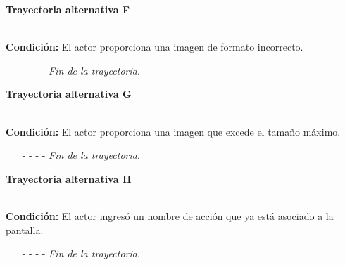 \hypertarget{CU11-1-1-2:TAF}{\textbf{Trayectoria alternativa F}}\\
\noindent \textbf{Condición:} El actor proporciona una imagen de formato incorrecto.
\begin{enumerate}
	\UCpaso[\UCsist] Muestra el mensaje  señalando el campo que presenta el error en la pantalla .
	\UCpaso Regresa al paso \ref{CU11.1.2-P4} de la trayectoria principal.
	\item[- -] - - {\em {Fin de la trayectoria}}.
\end{enumerate}
\hypertarget{CU11-1-1-2:TAG}{\textbf{Trayectoria alternativa G}}\\
\noindent \textbf{Condición:} El actor proporciona una imagen que excede el tamaño máximo.
\begin{enumerate}
	\UCpaso[\UCsist] Muestra el mensaje  señalando el campo que presenta el error en la pantalla .
	\UCpaso Regresa al paso \ref{CU11.1.2-P4} de la trayectoria principal.
	\item[- -] - - {\em {Fin de la trayectoria}}.
\end{enumerate}
\hypertarget{CU11-1-1-2:TAH}{\textbf{Trayectoria alternativa H}}\\
\noindent \textbf{Condición:} El actor ingresó un nombre de acción que ya está asociado a la pantalla.
\begin{enumerate}
	\UCpaso[\UCsist] Muestra el mensaje  señalando el campo que presenta la duplicidad en la pantalla .
	\UCpaso Regresa al paso \ref{CU11.1.2-P4} de la trayectoria principal.
	\item[- -] - - {\em {Fin de la trayectoria}}.
\end{enumerate}